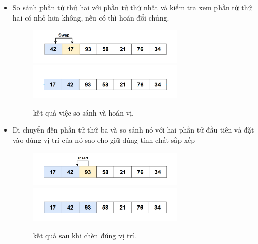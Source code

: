 \begin{itemize}
    \item So sánh phần tử thứ hai với phần tử thứ nhất và kiểm tra xem phần tử thứ hai có nhỏ hơn không, nếu có thì hoán đổi chúng.

    \begin{figure}[H]
        \centering
        \includegraphics[width=0.7\textwidth]{img/inssertion sort/3.png}
        \includegraphics[width=0.7\textwidth]{img/inssertion sort/4.png}

\caption{kết quả việc so sánh và hoán vị.}
    \end{figure}
    
\end{itemize}

\begin{itemize}
    \item Di chuyển đến phần tử thứ ba và so sánh nó với hai phần tử đầu tiên và đặt vào đúng vị trí của nó sao cho giữ đúng tính chất sắp xếp
    \begin{figure}[H]
        \centering
        \includegraphics[width=0.7\textwidth]{img/inssertion sort/5.png}
        \includegraphics[width=0.7\textwidth]{img/inssertion sort/6.png}

         \caption{kết quả sau khi chèn đúng vị trí.}
    \end{figure}
    
\end{itemize}

\newpage

